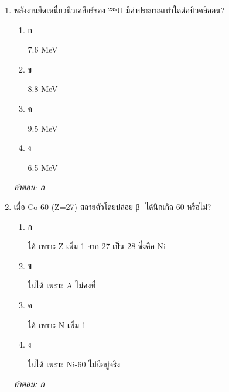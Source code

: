 \documentclass[12pt]{article}
\begin{document}
\begin{enumerate}[label=\arabic*., itemsep=0.5\baselineskip, topsep=0.5\baselineskip, leftmargin=*]
\item พลังงานยึดเหนี่ยวนิวเคลียร์ของ ²³⁵U มีค่าประมาณเท่าใดต่อนิวคลีออน?
\begin{enumerate}[label=\alph*)., itemsep=0.3\baselineskip, topsep=0.3\baselineskip]
\item ก\ 
\begin{minipage}[t]{0.9\linewidth}
\raggedright 7.6 MeV
\end{minipage}
\item ข\ 
\begin{minipage}[t]{0.9\linewidth}
\raggedright 8.8 MeV
\end{minipage}
\item ค\ 
\begin{minipage}[t]{0.9\linewidth}
\raggedright 9.5 MeV
\end{minipage}
\item ง\ 
\begin{minipage}[t]{0.9\linewidth}
\raggedright 6.5 MeV
\end{minipage}
\end{enumerate}
\vspace{-0.3\baselineskip}
\begin{small}
\textit{คำตอบ: ก}
\end{small}

\item เมื่อ Co-60 (Z=27) สลายตัวโดยปล่อย β⁻ ได้นิกเกิล-60 หรือไม่?
\begin{enumerate}[label=\alph*)., itemsep=0.3\baselineskip, topsep=0.3\baselineskip]
\item ก\ 
\begin{minipage}[t]{0.9\linewidth}
\raggedright ได้ เพราะ Z เพิ่ม 1 จาก 27 เป็น 28 ซึ่งคือ Ni
\end{minipage}
\item ข\ 
\begin{minipage}[t]{0.9\linewidth}
\raggedright ไม่ได้ เพราะ A ไม่คงที่
\end{minipage}
\item ค\ 
\begin{minipage}[t]{0.9\linewidth}
\raggedright ได้ เพราะ N เพิ่ม 1
\end{minipage}
\item ง\ 
\begin{minipage}[t]{0.9\linewidth}
\raggedright ไม่ได้ เพราะ Ni-60 ไม่มีอยู่จริง
\end{minipage}
\end{enumerate}
\vspace{-0.3\baselineskip}
\begin{small}
\textit{คำตอบ: ก}
\end{small}


\end{enumerate}
\end{document}
